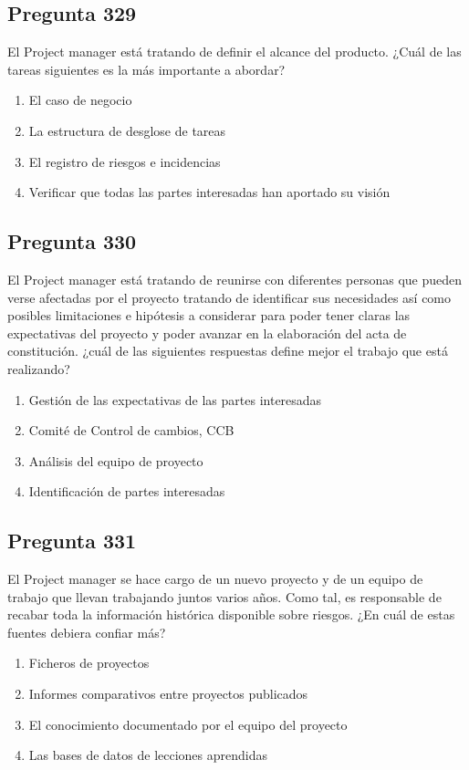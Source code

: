 \documentclass[11pt,a4paper]{article}
\begin{document}
\subsection*{Pregunta 329}
El Project manager está tratando de definir el alcance del producto. ¿Cuál de las tareas siguientes es la más importante a abordar?

\begin{enumerate}[label=\alph*)]
  \item El caso de negocio
  \item La estructura de desglose de tareas
  \item El registro de riesgos e incidencias
  \item Verificar que todas las partes interesadas han aportado su visión
\end{enumerate}

\subsection*{Pregunta 330}
El Project manager está tratando de reunirse con diferentes personas que pueden verse afectadas por el proyecto tratando de identificar sus necesidades así como posibles limitaciones e hipótesis a considerar para poder tener claras las expectativas del proyecto y poder avanzar en la elaboración del acta de constitución. ¿cuál de las siguientes respuestas define mejor el trabajo que está realizando?

\begin{enumerate}[label=\alph*)]
  \item Gestión de las expectativas de las partes interesadas
  \item Comité de Control de cambios, CCB
  \item Análisis del equipo de proyecto
  \item Identificación de partes interesadas
\end{enumerate}

\subsection*{Pregunta 331}
El Project manager se hace cargo de un nuevo proyecto y de un equipo de trabajo que llevan trabajando juntos varios años. Como tal, es responsable de recabar toda la información histórica disponible sobre riesgos. ¿En cuál de estas fuentes debiera confiar más?

\begin{enumerate}[label=\alph*)]
  \item Ficheros de proyectos
  \item Informes comparativos entre proyectos publicados
  \item El conocimiento documentado por el equipo del proyecto
  \item Las bases de datos de lecciones aprendidas
\end{enumerate}
\end{document}
